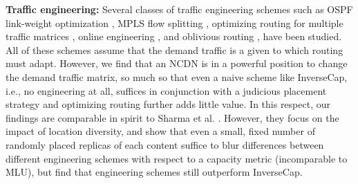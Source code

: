\textbf{Traffic engineering:} Several classes of traffic engineering schemes such as OSPF link-weight optimization \cite{fortz2000internet}, MPLS flow splitting \cite{MPLS2},  optimizing routing for multiple traffic matrices \cite{COPE, multiTM}, online engineering \cite{TEXCP,MPLS2}, and oblivious routing \cite{Cohen,Racke}, have been studied. All of these schemes assume that the demand traffic is a given to which routing must adapt. However, we find that an NCDN is in a powerful position to change the demand traffic matrix, so much so that even a naive scheme like InverseCap, i.e., no engineering at all, suffices in conjunction with a judicious placement strategy and optimizing routing further adds little value. In this respect, our findings are comparable in spirit to Sharma et al. \cite{Abhigyan}. However, they focus on the impact of location diversity, and show that even a small, fixed number of randomly placed replicas of each content suffice to  blur differences between different engineering schemes with respect to a capacity metric (incomparable to MLU), but find that engineering schemes still outperform InverseCap.




